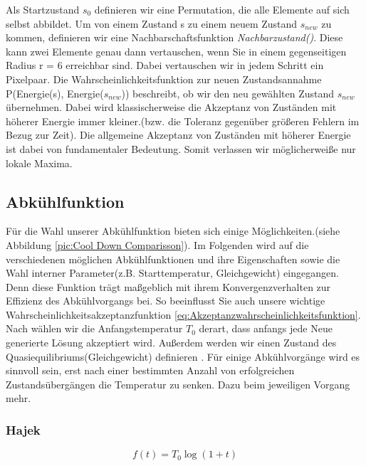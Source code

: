 Als Startzustand $s_{0}$ definieren wir eine Permutation, die alle 
Elemente auf sich selbst abbildet.
Um von einem Zustand s zu einem neuem Zustand $s_{new}$ zu kommen,
definieren wir eine Nachbarschaftsfunktion \textit{Nachbarzustand()}. 
Diese kann zwei Elemente genau dann vertauschen, wenn Sie in einem 
gegenseitigen Radius r = 6 erreichbar sind.\cite[S.7]{hal02158423} Dabei vertauschen wir
in jedem Schritt ein Pixelpaar. 
Die Wahrscheinlichkeitsfunktion zur neuen Zustandsannahme
P(Energie(s), Energie($s_{new}$)) beschreibt, ob wir den neu
gewählten Zustand $s_{new}$ übernehmen. Dabei wird klassischerweise die
Akzeptanz von Zuständen mit höherer Energie immer kleiner.(bzw. die 
Toleranz gegenüber größeren Fehlern im Bezug zur Zeit). Die allgemeine Akzeptanz von 
Zuständen mit höherer Energie ist dabei von fundamentaler Bedeutung.
Somit verlassen wir möglicherweiße nur lokale Maxima.

\subsection{Abkühlfunktion}
\label{subsec:Abkühlfunktion}

Für die Wahl unserer Abkühlfunktion bieten sich einige Möglichkeiten.(siehe Abbildung \ref{pic:Cool Down Comparisson}).
Im Folgenden wird auf die verschiedenen möglichen Abkühlfunktionen und ihre Eigenschaften
sowie die Wahl interner Parameter(z.B. Starttemperatur, Gleichgewicht) eingegangen. Denn diese Funktion
trägt maßgeblich mit ihrem Konvergenzverhalten zur Effizienz des Abkühlvorgangs bei.
So beeinflusst Sie auch unsere wichtige Wahrscheinlichkeitsakzeptanzfunktion \ref{eq:Akzeptanzwahrscheinlichkeitsfunktion}.
Nach \cite{Kirkpatrick671} wählen wir die Anfangstemperatur $T_0$ derart, dass anfangs jede Neue generierte Lösung akzeptiert
wird. Außerdem werden wir einen Zustand des Quasiequilibriums(Gleichgewicht) definieren \cite{ScienceDirectCoolingSchedule}.
Für einige Abkühlvorgänge wird es sinnvoll sein, erst nach einer bestimmten Anzahl von erfolgreichen Zustandsübergängen 
die Temperatur zu senken. Dazu beim jeweiligen Vorgang mehr.

\subsubsection{Hajek}

\begin{equation}\label{eq:Hajek}
    f(t) = T_0\log(1+t)
\end{equation}

